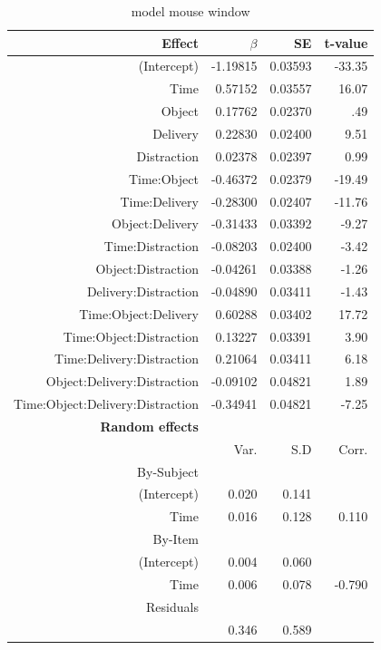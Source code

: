 \documentclass[a4paper,man,natbib]{apa6}
\begin{document}
\begin{table}
\begin{tabular}{rrrr}
\hline
Effect & $\beta$ & SE & t-value\\
\hline
(Intercept) & -1.19815 & 0.03593 & -33.35\\
Time & 0.57152 & 0.03557 & 16.07\\
Object & 0.17762 & 0.02370 & .49\\
Delivery & 0.22830 & 0.02400 & 9.51\\
Distraction & 0.02378 & 0.02397 & 0.99\\
Time:Object & -0.46372 & 0.02379 & -19.49\\
Time:Delivery & -0.28300 & 0.02407 & -11.76\\
Object:Delivery & -0.31433 & 0.03392 & -9.27\\
Time:Distraction & -0.08203 & 0.02400 & -3.42\\
Object:Distraction & -0.04261 & 0.03388 & -1.26\\
Delivery:Distraction & -0.04890 & 0.03411 & -1.43\\
Time:Object:Delivery & 0.60288 & 0.03402 & 17.72\\
Time:Object:Distraction & 0.13227 & 0.03391 & 3.90\\
Time:Delivery:Distraction & 0.21064 & 0.03411 & 6.18\\
Object:Delivery:Distraction & -0.09102 & 0.04821 & 1.89\\
Time:Object:Delivery:Distraction & -0.34941 & 0.04821 & -7.25\\
\hline
\textbf{Random effects} & & & \\
& Var. & S.D & Corr. \\
By-Subject & & &\\
(Intercept) & 0.020 & 0.141 &\\
Time & 0.016 & 0.128 & 0.110 \\
By-Item & & &\\
(Intercept) & 0.004 & 0.060 &\\
Time & 0.006 & 0.078 & -0.790 \\
Residuals & & & \\
& 0.346 & 0.589 & \\
\hline\end{tabular}
\caption{model mouse window}
\label{table:modelmouse}
\end{table}
\end{document}
